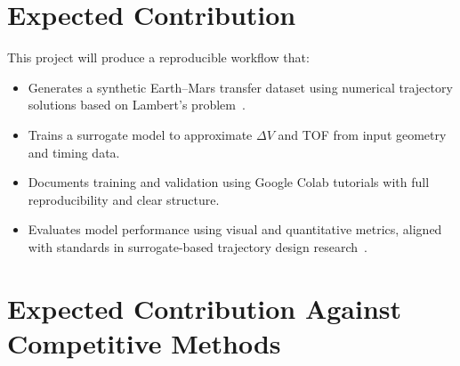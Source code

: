 \documentclass[conference]{IEEEtran}
\begin{document}
	\section{Expected Contribution}
	This project will produce a reproducible workflow that:
	\begin{itemize}
		\item Generates a synthetic Earth--Mars transfer dataset using numerical trajectory solutions based on Lambert’s problem~\cite{ruff2023surrogate}.
		\item Trains a surrogate model to approximate $\Delta V$ and TOF from input geometry and timing data.
		\item Documents training and validation using Google Colab tutorials with full reproducibility and clear structure.
		\item Evaluates model performance using visual and quantitative metrics, aligned with standards in surrogate-based trajectory design research~\cite{ruff2023surrogate,federici2024robust}.
	\end{itemize}
	
	\section{Expected Contribution Against Competitive Methods}
	\begin{table}[h]
		\caption{Comparison with Existing Methods}
		\centering
		\label{tab:comparison}
	\end{table}
	
\end{document}
